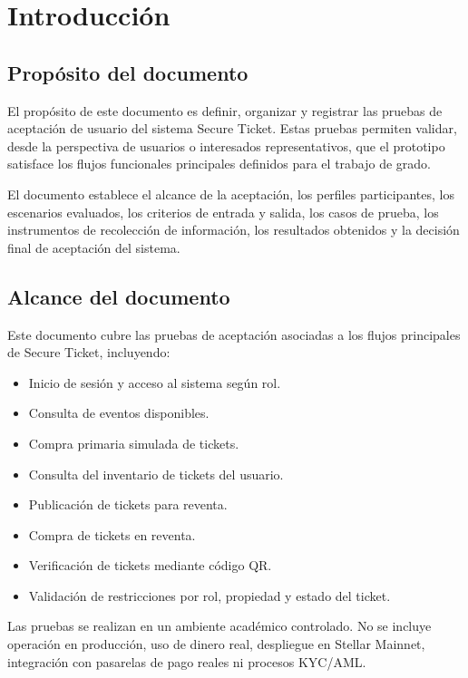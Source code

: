 \documentclass[12pt,letterpaper]{article}
\newcommand{\NombreProyecto}{Secure Ticket}
\begin{document}
\listoftables
\newpage

\section{Introducción}

\subsection{Propósito del documento}

El propósito de este documento es definir, organizar y registrar las pruebas de aceptación de usuario del sistema \NombreProyecto{}. Estas pruebas permiten validar, desde la perspectiva de usuarios o interesados representativos, que el prototipo satisface los flujos funcionales principales definidos para el trabajo de grado.

El documento establece el alcance de la aceptación, los perfiles participantes, los escenarios evaluados, los criterios de entrada y salida, los casos de prueba, los instrumentos de recolección de información, los resultados obtenidos y la decisión final de aceptación del sistema.

\subsection{Alcance del documento}

Este documento cubre las pruebas de aceptación asociadas a los flujos principales de \NombreProyecto{}, incluyendo:

\begin{itemize}[leftmargin=*]
    \item Inicio de sesión y acceso al sistema según rol.
    \item Consulta de eventos disponibles.
    \item Compra primaria simulada de tickets.
    \item Consulta del inventario de tickets del usuario.
    \item Publicación de tickets para reventa.
    \item Compra de tickets en reventa.
    \item Verificación de tickets mediante código QR.
    \item Validación de restricciones por rol, propiedad y estado del ticket.
\end{itemize}

Las pruebas se realizan en un ambiente académico controlado. No se incluye operación en producción, uso de dinero real, despliegue en Stellar Mainnet, integración con pasarelas de pago reales ni procesos KYC/AML.
\end{document}
